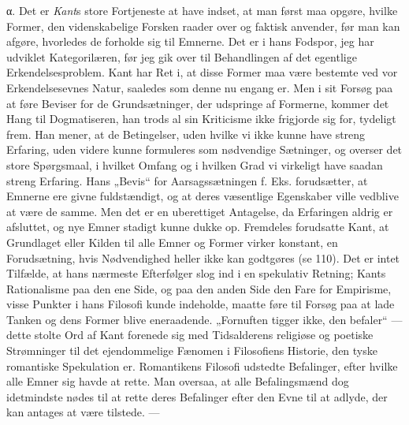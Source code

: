 \documentclass[12pt,a4paper]{book}
\newcommand{\apage}[1]{\marginnote{\footnotesize\textit{[#1]}}}
\begin{document}
α. Det er \emph{Kant}s store Fortjeneste at have indset, at man først maa opgøre,
hvilke Former, den videnskabelige Forsken raader over og faktisk anvender, før man
kan afgøre, hvorledes de forholde sig til Emnerne. Det er i hans Fodspor, jeg har
udviklet Kategorilæren, før jeg gik over til Behandlingen af det egentlige
Erkendelsesproblem. Kant har Ret i, at disse Former maa være bestemte ved vor
Erkendelsesevnes Natur, saaledes som denne nu engang er. Men i sit Forsøg paa at
føre Beviser for de Grundsætninger, der udspringe af Formerne, kommer det Hang til
Dogmatiseren, han trods al sin Kriticisme ikke frigjorde sig for, tydeligt frem.
Han mener, at de Betingelser, uden hvilke vi ikke kunne have streng Erfaring, uden
videre kunne formuleres som nødvendige Sætninger, og overser det store Spørgsmaal,
i hvilket Omfang og i hvilken Grad vi virkeligt have saadan streng Erfaring. Hans
„Bevis“ for Aarsagssætningen f. Eks. forudsætter, at Emnerne ere givne
fuldstændigt, og at deres væsentlige Egenskaber ville vedblive at være de samme.
Men det er en uberettiget Antagelse, da Erfaringen aldrig er afsluttet, og nye
Emner stadigt kunne \apage{267} dukke op. Fremdeles forudsatte Kant, at Grundlaget eller Kilden
til alle Emner og Former virker konstant, en Forudsætning, hvis Nødvendighed heller
ikke kan godtgøres (se 110). Det er intet Tilfælde, at hans nærmeste Efterfølger
slog ind i en spekulativ Retning; Kants Rationalisme paa den ene Side, og paa den
anden Side den Fare for Empirisme, visse Punkter i hans Filosofi kunde indeholde,
maatte føre til Forsøg paa at lade Tanken og dens Former blive eneraadende.
„Fornuften tigger ikke, den befaler“ --- dette stolte Ord af Kant forenede sig med
Tidsalderens religiøse og poetiske Strømninger til det ejendommelige Fænomen i
Filosofiens Historie, den tyske romantiske Spekulation er. Romantikens Filosofi
udstedte Befalinger, efter hvilke alle Emner sig havde at rette. Man oversaa, at
alle Befalingsmænd dog idetmindste nødes til at rette deres Befalinger efter den
Evne til at adlyde, der kan antages at være tilstede. ---
\end{document}
